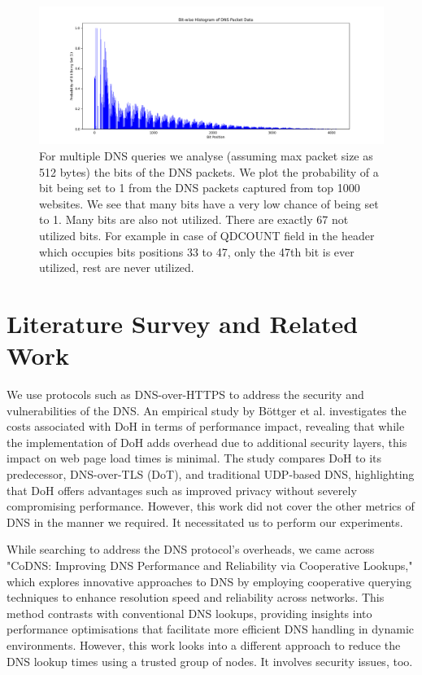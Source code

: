 \documentclass{article}
\begin{document}
\begin{figure}[htpb]
    \centering
    \vspace{-3mm}
    \includegraphics[width=\linewidth]{plots/bits-hist.png}
    \vspace{-7mm}
    \caption{For multiple DNS queries we analyse (assuming max packet size as 512 bytes) the bits of the DNS packets. We plot the probability of a bit being set to 1 from the DNS packets captured from top 1000 websites. We see that many bits have a very low chance of being set to 1. Many bits are also not utilized. There are exactly 67 not utilized bits. For example in case of QDCOUNT field in the header which occupies bits positions 33 to 47, only the 47th bit is ever utilized, rest are never utilized.}
    \vspace{-3mm}
    \label{fig:overall-candle}
\end{figure}
\section{Literature Survey and Related Work}

We use protocols such as DNS-over-HTTPS to address the security and vulnerabilities of the DNS. An empirical study by Böttger et al. \cite{dns-over-https} investigates the costs associated with DoH in terms of performance impact, revealing that while the implementation of DoH adds overhead due to additional security layers, this impact on web page load times is minimal. The study compares DoH to its predecessor, DNS-over-TLS (DoT), and traditional UDP-based DNS, highlighting that DoH offers advantages such as improved privacy without severely compromising performance. However, this work did not cover the other metrics of DNS in the manner we required. It necessitated us to perform our experiments.

While searching to address the DNS protocol's overheads, we came across "CoDNS: Improving DNS Performance and Reliability via Cooperative Lookups," \cite{codns} which explores innovative approaches to DNS by employing cooperative querying techniques to enhance resolution speed and reliability across networks. This method contrasts with conventional DNS lookups, providing insights into performance optimisations that facilitate more efficient DNS handling in dynamic environments. However, this work looks into a different approach to reduce the DNS lookup times using a trusted group of nodes. It involves security issues, too.
\end{document}
